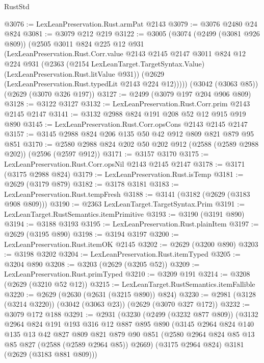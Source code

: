 \begin{lexlean}{RustStd}
\begin{coremodule}
@3076 := LexLeanPreservation.Rust.armPat @2143
@3079 := @3076 @2480 @24 @824
@3081 := @3079 @212 @219
@3122 := @3005
    (@3074
      (@2499 (@3081 @926 @809))
      (@2505
        @3011
        @824
        @225
        @12
        @931
        (LexLeanPreservation.Rust.Corr.value
          @2143
          @2145
          @2147
          @3011
          @824
          @12
          @224
          @931
          (@2363 (@2154 LexLeanTarget.TargetSyntax.Value) (LexLeanPreservation.Rust.litValue @931))
          (@2629 (LexLeanPreservation.Rust.typedLit @2143 @224 @12)))))
    (@3042 (@3063 @85))
    (@2629 (@3070 @326 @197))
@3127 := @2499 (@3079 @197 @204 @906 @809)
@3128 := @3122 @3127
@3132 := LexLeanPreservation.Rust.Corr.prim @2143 @2145 @2147
@3141 := @3132 @2988 @824 @191 @208 @52 @12 @915 @919 @890
@3145 := LexLeanPreservation.Rust.Corr.opsCons @2143 @2145 @2147
@3157 := @3145 @2988 @824 @206 @135 @50 @42 @912 @809 @821 @879 @95 @851
@3170 := @2580 @2988 @824 @202 @50 @202 @912 (@2588 (@2589 @2988 @202)) (@2596 (@2597 @912))
@3171 := @3157 @3170
@3175 := LexLeanPreservation.Rust.Corr.opsNil @2143 @2145 @2147
@3178 := @3171 (@3175 @2988 @824)
@3179 := LexLeanPreservation.Rust.isTemp
@3181 := @2629 (@3179 @879)
@3182 := @3178 @3181
@3183 := LexLeanPreservation.Rust.tempFresh
@3188 := @3141 (@3182 (@2629 (@3183 @908 @809)))
@3190 := @2363 LexLeanTarget.TargetSyntax.Prim
@3191 := LexLeanTarget.RustSemantics.itemPrimitive
@3193 := @3190 (@3191 @890)
@3194 := @3188 @3193
@3195 := LexLeanPreservation.Rust.plainItem
@3197 := @2629 (@3195 @890)
@3198 := @3194 @3197
@3200 := LexLeanPreservation.Rust.itemOK @2145
@3202 := @2629 (@3200 @890)
@3203 := @3198 @3202
@3204 := LexLeanPreservation.Rust.itemTyped
@3205 := @3204 @890
@3208 := @3203 (@2629 (@3205 @52))
@3209 := LexLeanPreservation.Rust.primTyped
@3210 := @3209 @191
@3214 := @3208 (@2629 (@3210 @52 @12))
@3215 := LexLeanTarget.RustSemantics.itemFallible
@3220 := @2629 (@2630 (@2631 (@3215 @890)) @824)
@3230 := @2981 (@3128 (@3214 @3220)) (@3042 (@3063 @23)) (@2629 (@3070 @327 @172))
@3232 := @3079 @172 @188
@3291 := @2931
    (@3230
      (@2499 (@3232 @877 @809))
      (@3132
        @2964
        @824
        @191
        @193
        @316
        @12
        @887
        @895
        @890
        (@3145
          @2964
          @824
          @140
          @135
          @13
          @42
          @827
          @809
          @821
          @879
          @90
          @851
          (@2580 @2964 @824 @85 @13 @85 @827 (@2588 (@2589 @2964 @85)) @2669)
          (@3175 @2964 @824)
          @3181
          (@2629 (@3183 @881 @809)))

\end{coremodule}
\end{lexlean}
